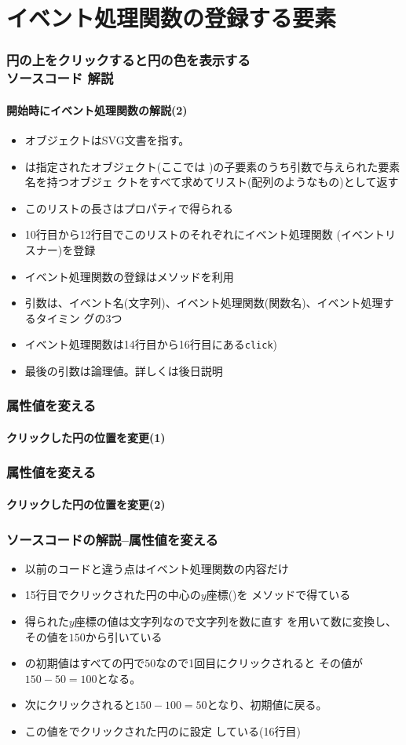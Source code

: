 \section{イベント処理関数の登録する要素}
\begin{frame}[containsverbatim]
 \frametitle{円の上をクリックすると円の色を表示する\\ソースコード
 解説}
  \framesubtitle{開始時にイベント処理関数の解説(2)}
\begin{itemize}
 \item {}オブジェクトはSVG文書を指す。
 \item {}は指定されたオブジェクト(ここでは
       )の子要素のうち引数で与えられた要素名を持つオブジェ
       クトをすべて求めてリスト(配列のようなもの)として返す
 \item このリストの長さはプロパティで得られる
 \item 10行目から12行目でこのリストのそれぞれにイベント処理関数
       (イベントリスナー)を登録
 \item イベント処理関数の登録はメソッドを利用
 \item 引数は、イベント名(文字列)、イベント処理関数(関数名)、イベント処理するタイミン
       グの3つ
 \item イベント処理関数は14行目から16行目にある\texttt{click})
 \item 最後の引数は論理値。詳しくは後日説明
\end{itemize}
\end{frame}
\begin{frame}[containsverbatim]
 \frametitle{属性値を変える}
 \framesubtitle{クリックした円の位置を変更(1)}
\end{frame}
\begin{frame}[containsverbatim]
 \frametitle{属性値を変える}
 \framesubtitle{クリックした円の位置を変更(2)}
\end{frame}
\begin{frame}[containsverbatim]
 \frametitle{ソースコードの解説--属性値を変える}
 \begin{itemize}
  \item 以前のコードと違う点はイベント処理関数の内容だけ
  \item 15行目でクリックされた円の中心の$y$座標()を
        メソッドで得ている
  \item 得られた$y$座標の値は文字列なので文字列を数に直す
        を用いて数に変換し、その値を$150$から引いている
  \item {}の初期値はすべての円で$50$なので1回目にクリックされると
        その値が$150-50=100$となる。
  \item 次にクリックされると$150-100=50$となり、初期値に戻る。
  \item この値をでクリックされた円のに設定
        している(16行目)
 \end{itemize}
\end{frame}
